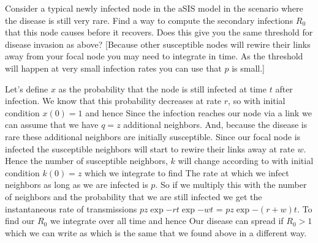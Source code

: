 Consider a typical newly infected node in the aSIS model in the scenario where the disease is still very rare. Find a way to compute the secondary infections $R_0$ that this node causes before it recovers. Does this give you the same threshold for disease invasion as above? [Because other susceptible nodes will rewire their links away from your focal node you may need to integrate in time. As the threshold will happen at very small infection rates you can use that $p$ is small.] 

\solution
Let's define $x$ as the probability that the node is still infected at time $t$ after infection. We know that this probability decreases at rate $r$, so 
with initial condition $x(0)=1$ and hence 
Since the infection reaches our node via a link we can assume that we have $q=z$ additional neighbors. And, because the disease is rare these additional neighbors are initially susceptible. Since our focal node is infected the susceptible neighbors will start to rewire their links away at rate $w$. Hence the number of susceptible neighbors, $k$ will change according to  
with initial condition $k(0)=z$ which we integrate to find 
The rate at which we infect neighbors as long as we are infected is $p$. So if we multiply this with the number of neighbors and the probability that we are still infected we get the instantaneous rate of transmissions $pz\exp{-rt}\exp{-wt}$ = $pz\exp{-(r+w)t}$. To find our $R_0$ we integrate over all time 
and hence 
Our disease can spread if $R_0>1$ which we can write as 
which is the same that we found above in a different way.


